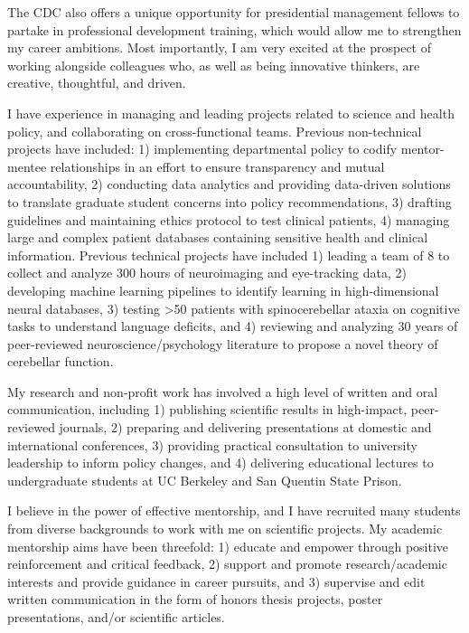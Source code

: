 \documentclass[11pt, a4paper]{maedbh-cv}
\begin{document}
\begin{cvletter}
The CDC also offers a unique opportunity for presidential management fellows to partake in professional development training, which would allow me to strengthen my career ambitions. Most importantly, I am very excited at the prospect of working alongside colleagues who, as well as being innovative thinkers, are creative, thoughtful, and driven.

I have experience in managing and leading projects related to science and health policy, and collaborating on cross-functional teams. Previous non-technical projects have included: 1) implementing departmental policy to codify mentor-mentee relationships in an effort to ensure transparency and mutual accountability, 2) conducting data analytics and providing data-driven solutions to translate graduate student concerns into policy recommendations, 3) drafting guidelines and maintaining ethics protocol to test clinical patients, 4) managing large and complex patient databases containing sensitive health and clinical information. Previous technical projects have included 1) leading a team of 8 to collect and analyze 300 hours of neuroimaging and eye-tracking data, 2) developing machine learning pipelines to identify learning in high-dimensional neural databases, 3) testing >50 patients with spinocerebellar ataxia on cognitive tasks to understand language deficits, and 4) reviewing and analyzing 30 years of peer-reviewed neuroscience/psychology literature to propose a novel theory of cerebellar function.

	My research and non-profit work has involved a high level of written and oral communication, including 1) publishing scientific results in high-impact, peer-reviewed journals, 2) preparing and delivering presentations at domestic and international conferences, 3) providing practical consultation to university leadership to inform policy changes, and 4) delivering educational lectures to undergraduate students at UC Berkeley and San Quentin State Prison. 

	I believe in the power of effective mentorship, and I have recruited many students from diverse backgrounds to work with me on scientific projects. My academic mentorship aims have been threefold: 1) educate and empower through positive reinforcement and critical feedback, 2) support and promote research/academic interests and provide guidance in career pursuits, and 3) supervise and edit written communication in the form of honors thesis projects, poster presentations, and/or scientific articles. 


\end{cvletter}
\end{document}
